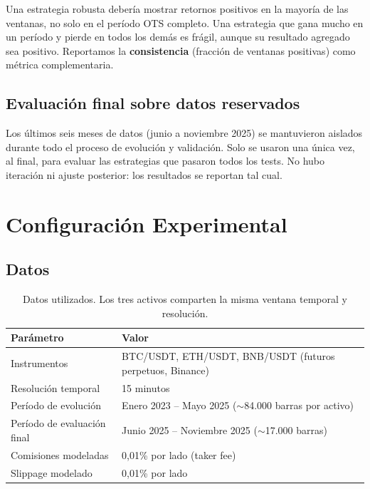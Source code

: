 \documentclass[12pt,a4paper]{article}
\begin{document}
Una estrategia robusta debería mostrar retornos positivos en la mayoría de las
ventanas, no solo en el período OTS completo. Una estrategia que gana mucho en un
período y pierde en todos los demás es frágil, aunque su resultado agregado sea
positivo. Reportamos la \textbf{consistencia} (fracción de ventanas positivas) como
métrica complementaria.

\subsection{Evaluación final sobre datos reservados}
\label{sec:ots}

Los últimos seis meses de datos (junio a noviembre 2025) se mantuvieron aislados
durante todo el proceso de evolución y validación. Solo se usaron una única vez, al
final, para evaluar las estrategias que pasaron todos los tests. No hubo iteración
ni ajuste posterior: los resultados se reportan tal cual.

\section{Configuración Experimental}
\label{sec:config}

\subsection{Datos}

\begin{table}[H]
\centering
\caption{Datos utilizados. Los tres activos comparten la misma ventana temporal y
resolución.}
\label{tab:data}
\begin{tabular}{ll}
\toprule
\textbf{Parámetro} & \textbf{Valor} \\
\midrule
Instrumentos & BTC/USDT, ETH/USDT, BNB/USDT (futuros perpetuos, Binance) \\
Resolución temporal & 15 minutos \\
Período de evolución & Enero 2023 -- Mayo 2025 ($\sim$84.000 barras por activo) \\
Período de evaluación final & Junio 2025 -- Noviembre 2025 ($\sim$17.000 barras) \\
Comisiones modeladas & 0,01\% por lado (taker fee) \\
Slippage modelado & 0,01\% por lado \\
\bottomrule
\end{tabular}
\end{table}
\end{document}
